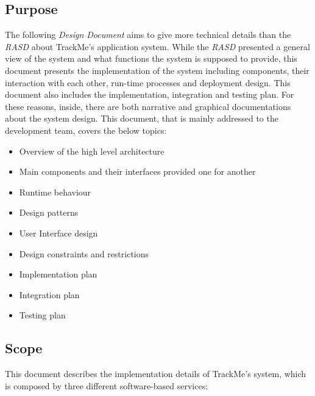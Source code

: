 \subsection{Purpose}
The following \textit{Design Document} aims to give more technical details than the \textit{RASD} about TrackMe's application system. While the \textit{RASD} presented a general view of the system and what functions the system is supposed to provide, this document presents the implementation of the system including components, their interaction with each other, run-time processes and deployment design. This document also includes the implementation, integration and testing plan. For these reasons, inside, there are both narrative and graphical documentations about the system design.
\bigbreak
\noindent
This document, that is mainly addressed to the development team, covers the below topics:
\begin{itemize}[noitemsep]
\item Overview of the high level architecture
\item Main components and their interfaces provided one for another
\item Runtime behaviour
\item Design patterns
\item User Interface design
\item Design constraints and restrictions
\item Implementation plan
\item Integration plan
\item Testing plan
\end{itemize}

\subsection{Scope} 
This document describes the implementation details of TrackMe's system, which is composed by three different software-based services:

